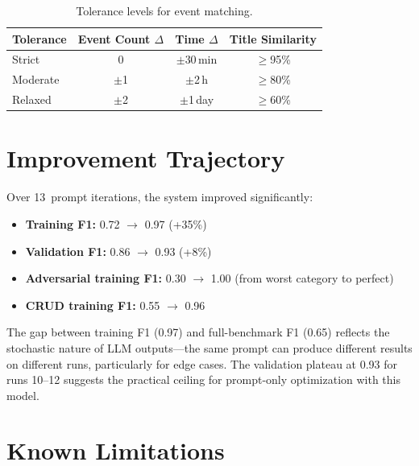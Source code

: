 \documentclass[12pt]{article}
\begin{document}
\begin{table}[ht]
\centering
\caption{Tolerance levels for event matching.}
\label{tab:tolerance}
\begin{tabular}{@{}lccc@{}}
\toprule
\textbf{Tolerance} & \textbf{Event Count $\Delta$}
& \textbf{Time $\Delta$} & \textbf{Title Similarity} \\
\midrule
Strict   & 0    & $\pm$30\,min & $\geq$95\% \\
Moderate & $\pm$1 & $\pm$2\,h  & $\geq$80\% \\
Relaxed  & $\pm$2 & $\pm$1\,day & $\geq$60\% \\
\bottomrule
\end{tabular}
\end{table}

\section{Improvement Trajectory}

Over 13~prompt iterations, the system improved significantly:

\begin{itemize}
    \item \textbf{Training F1:} 0.72 $\rightarrow$ 0.97 (+35\%)
    \item \textbf{Validation F1:} 0.86 $\rightarrow$ 0.93 (+8\%)
    \item \textbf{Adversarial training F1:} 0.30 $\rightarrow$ 1.00
          (from worst category to perfect)
    \item \textbf{CRUD training F1:} 0.55 $\rightarrow$ 0.96
\end{itemize}

The gap between training F1 (0.97) and full-benchmark F1 (0.65) reflects
the stochastic nature of LLM outputs---the same prompt can produce
different results on different runs, particularly for edge cases. The
validation plateau at 0.93 for runs 10--12 suggests the practical ceiling
for prompt-only optimization with this model.

\section{Known Limitations}
\end{document}
